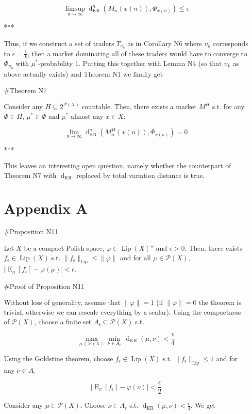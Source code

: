 \documentclass[a4paper]{article}
\DeclareMathOperator{\E}{E}
\newcommand{\Abs}[1]{\lvert #1 \rvert}
\newcommand{\Norm}[1]{\lVert #1 \rVert}
\newcommand{\Prob}{\mathcal{P}}
\newcommand{\Lip}{\operatorname{Lip}}
\newcommand{\NormL}[1]{\Norm{#1}_{\operatorname{Lip}}}
\newcommand{\Dkr}{\operatorname{d}_{\text{KR}}}
\begin{document}
$$\limsup_{n \rightarrow \infty} \Dkr^n(M_n(x(n)),\Phi_{x(n)}) \leq \epsilon$$

***

Thus, if we construct a set of traders ${T_{\upsilon_k}}$ as in Corollary N6 where ${\upsilon_k}$ corresponds to ${\epsilon=\frac{1}{k}}$, then a market dominating all of these traders would have to converge to ${\Phi_{y_n}}$ with ${\mu^*}$-probability 1. Putting this together with Lemma N4 (so that ${\upsilon_k}$ as above actually exists) and Theorem N1 we finally get

\#Theorem N7

Consider any ${H \subseteq 2^{\Prob(X)}}$ countable. Then, there exists a market ${M^H}$ s.t. for any ${\Phi \in H}$, ${\mu^* \in \Phi}$ and ${\mu^*}$-almost any ${x \in X}$:

$$\lim_{n \rightarrow \infty} \Dkr^n(M^H_n(x(n)),\Phi_{x(n)}) = 0$$

***

This leaves an interesting open question, namely whether the counterpart of Theorem N7 with ${\Dkr}$ replaced by total variation distance is true.

\section{Appendix A}

\#Proposition N11

Let $X$ be a compact Polish space, $\varphi \in \Lip(X)''$ and $\epsilon > 0$. Then, there exists $f_\epsilon \in \Lip(X)$ s.t. $\NormL{f_\epsilon} \leq \Norm{\varphi}$ and for all $\mu \in \Prob(X)$, $\Abs{\E_\mu[f_\epsilon] - \varphi(\mu)} < \epsilon$.

\#Proof of Proposition N11

Without loss of generality, assume that $\Norm{\varphi}=1$ (if $\Norm{\varphi}=0$ the theorem is trivial, otherwise we can rescale everything by a scalar). Using the compactness of $\Prob(X)$, choose a finite set $A_\epsilon \subseteq \Prob(X)$ s.t. 

$$\max_{\mu \in \Prob(X)} \min_{\nu \in A_\epsilon}\, \Dkr(\mu,\nu) < \frac{\epsilon}{4}$$

Using the Goldstine theorem, choose $f_\epsilon \in \Lip(X)$ s.t. $\NormL{f_\epsilon} \leq 1$ and for any $\nu \in A_\epsilon$ 

$$\Abs{\E_\nu[f_\epsilon] - \varphi(\nu)} < \frac{\epsilon}{2}$$

Consider any $\mu \in \Prob(X)$. Choose $\nu \in A_\epsilon$ s.t. $\Dkr(\mu,\nu) < \frac{\epsilon}{4}$. We get
\end{document}
